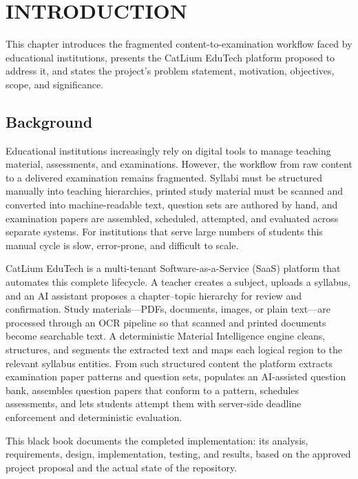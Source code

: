 \chapter{INTRODUCTION}
\thispagestyle{empty}

This chapter introduces the fragmented content-to-examination workflow
faced by educational institutions, presents the CatLium EduTech platform
proposed to address it, and states the project's problem statement,
motivation, objectives, scope, and significance.

\clearpage

\section{Background}

Educational institutions increasingly rely on digital tools to manage
teaching material, assessments, and examinations. However, the workflow from
raw content to a delivered examination remains fragmented. Syllabi must be
structured manually into teaching hierarchies, printed study material must
be scanned and converted into machine-readable text, question sets are
authored by hand, and examination papers are assembled, scheduled, attempted,
and evaluated across separate systems. For institutions that serve large
numbers of students this manual cycle is slow, error-prone, and difficult to
scale.

CatLium EduTech is a multi-tenant Software-as-a-Service (SaaS) platform that
automates this complete lifecycle. A teacher creates a subject, uploads a
syllabus, and an AI assistant proposes a chapter--topic hierarchy for review
and confirmation. Study materials---PDFs, documents, images, or plain
text---are processed through an OCR pipeline so that scanned and printed
documents become searchable text. A deterministic Material Intelligence
engine cleans, structures, and segments the extracted text and maps each
logical region to the relevant syllabus entities. From such structured
content the platform extracts examination paper patterns and question sets,
populates an AI-assisted question bank, assembles question papers that
conform to a pattern, schedules assessments, and lets students attempt them
with server-side deadline enforcement and deterministic evaluation.

This black book documents the completed implementation: its analysis,
requirements, design, implementation, testing, and results, based on the
approved project proposal and the actual state of the repository.

